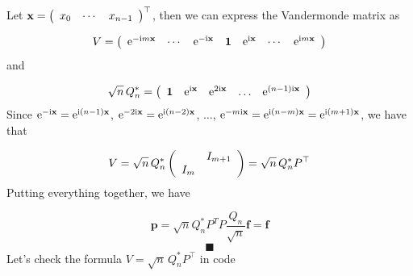 \documentclass[12pt,landscape]{article}
\begin{document}
{Let $\mathbf{x} = \left(\begin{array}{c c c} x_0 & \cdots & x_{n-1}  \end{array}\right)^{\top}$, then we can express the Vandermonde matrix as

\[
V = 
\left(
\begin{array}{c c c c c c c}
{\rm e}^{-{\rm i}m\mathbf{x}}  & \cdots & {\rm e}^{-{\rm i}\mathbf{x}} &\mathbf{1}  & {\rm e}^{{\rm i}\mathbf{x}} & \cdots & {\rm e}^{{\rm i}m\mathbf{x}}
\end{array}
\right)
\]
and

\[
\sqrt{n}\,Q_n^* = \left(
\begin{array}{c c c c c}
\mathbf{1}  & {\rm e}^{{\rm i}\mathbf{x}} & {\rm e}^{2{\rm i}\mathbf{x}} & \ldots & {\rm e}^{(n-1){\rm i}\mathbf{x}}
\end{array}
\right)
\]
Since ${\rm e}^{-{\rm i}\mathbf{x}} = {\rm e}^{{\rm i}(n-1)\mathbf{x}}$, ${\rm e}^{-2{\rm i}\mathbf{x}} = {\rm e}^{{\rm i}(n-2)\mathbf{x}}$, $\dots$, ${\rm e}^{-m{\rm i}\mathbf{x}} = {\rm e}^{{\rm i}(n-m)\mathbf{x}} = {\rm e}^{{\rm i}(m+1)\mathbf{x}}$, we have that

\[
V = \sqrt{n}\,Q_n^*\left(
\begin{array}{c c}
 & I_{m+1} \\
I_m &
\end{array}
\right) =  \sqrt{n}\,Q_n^* P^{\top}
\]
Putting everything together, we have

\[
\mathbf{p} = \sqrt{n}Q_n^* P^{T} P \frac{Q_n}{\sqrt{n}}\mathbf{f} = \mathbf{f}
\]
\[
\blacksquare
\]
Let's check the formula $V = \sqrt{n}\,Q_n^* P^{\top}$ in code


}
\end{document}
